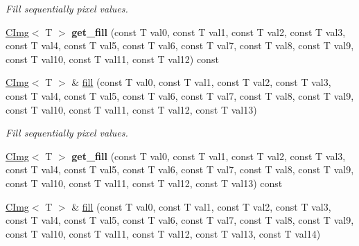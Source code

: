 \begin{DoxyCompactItemize}
\begin{DoxyCompactList}\small\item\em Fill sequentially pixel values. \item\end{DoxyCompactList}\item 
\hypertarget{structcimg__library_1_1CImg_a5bf3aa89f011dae0ceae96d309907224}{
\hyperlink{structcimg__library_1_1CImg}{CImg}$<$ T $>$ {\bfseries get\_\-fill} (const T val0, const T val1, const T val2, const T val3, const T val4, const T val5, const T val6, const T val7, const T val8, const T val9, const T val10, const T val11, const T val12) const }
\label{structcimg__library_1_1CImg_a5bf3aa89f011dae0ceae96d309907224}

\item 
\hypertarget{structcimg__library_1_1CImg_a3b38822d098614f5460f4b596ac18c2c}{
\hyperlink{structcimg__library_1_1CImg}{CImg}$<$ T $>$ \& \hyperlink{structcimg__library_1_1CImg_a3b38822d098614f5460f4b596ac18c2c}{fill} (const T val0, const T val1, const T val2, const T val3, const T val4, const T val5, const T val6, const T val7, const T val8, const T val9, const T val10, const T val11, const T val12, const T val13)}
\label{structcimg__library_1_1CImg_a3b38822d098614f5460f4b596ac18c2c}

\begin{DoxyCompactList}\small\item\em Fill sequentially pixel values. \item\end{DoxyCompactList}\item 
\hypertarget{structcimg__library_1_1CImg_ae29138831e1f74198ba6a1ec6ff4bcb9}{
\hyperlink{structcimg__library_1_1CImg}{CImg}$<$ T $>$ {\bfseries get\_\-fill} (const T val0, const T val1, const T val2, const T val3, const T val4, const T val5, const T val6, const T val7, const T val8, const T val9, const T val10, const T val11, const T val12, const T val13) const }
\label{structcimg__library_1_1CImg_ae29138831e1f74198ba6a1ec6ff4bcb9}

\item 
\hypertarget{structcimg__library_1_1CImg_a78ebfb8dfadd456f3a03e3c6233a0d35}{
\hyperlink{structcimg__library_1_1CImg}{CImg}$<$ T $>$ \& \hyperlink{structcimg__library_1_1CImg_a78ebfb8dfadd456f3a03e3c6233a0d35}{fill} (const T val0, const T val1, const T val2, const T val3, const T val4, const T val5, const T val6, const T val7, const T val8, const T val9, const T val10, const T val11, const T val12, const T val13, const T val14)}
\label{structcimg__library_1_1CImg_a78ebfb8dfadd456f3a03e3c6233a0d35}


\end{DoxyCompactItemize}
